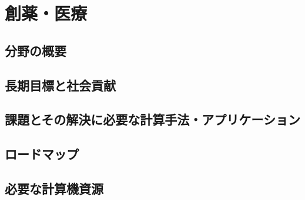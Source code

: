 \section{創薬・医療}
\label{sec:創薬医療}

\subsection{分野の概要}

\subsection{長期目標と社会貢献}

\subsection{課題とその解決に必要な計算手法・アプリケーション}

\subsection{ロードマップ}

\subsection{必要な計算機資源}


\nocite{*}



